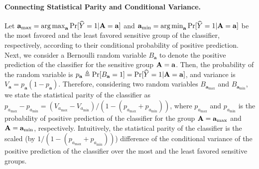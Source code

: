 \paragraph{Connecting Statistical Parity and Conditional Variance.} Let $ \mathbf{a}_{\max} = \operatorname*{arg\,max}_{\mathbf{a}} \Pr[\widehat{Y} = 1 |  \mathbf{A} = \mathbf{a}] $ and $ \mathbf{a}_{\min} = \operatorname*{arg\,min}_{\mathbf{a}} \Pr[\widehat{Y} = 1 | \mathbf{A} = \mathbf{a}] $ be the most favored and the least favored sensitive group of the classifier, respectively, according to their conditional probability of positive prediction. Next, we consider a Bernoulli random variable $ B_{\mathbf{a}} $ to denote the positive prediction of the classifier for the sensitive group $ \mathbf{A} = \mathbf{a} $. Then, the probability of the random variable is $ p_\mathbf{a} \triangleq \Pr[B_{\mathbf{a}} = 1] = \Pr[\widehat{Y} = 1| \mathbf{A} = \mathbf{a}] $, and variance is $ V_{\mathbf{a}} = p_{\mathbf{a}}(1-p_{\mathbf{a}}) $. Therefore, considering two random variables $ B_{\mathbf{a}_{\max}} $ and $ B_{\mathbf{a}_{\min}} $, we state the statistical parity of the classifier as $ p_{a_{\max}} - p_{a_{\min}} = (V_{a_{\max}} - V_{a_{\min}})/(1  - (p_{a_{\max}} + p_{a_{\min}})) $, where $ p_{a_{\max}} $ and $ p_{a_{\min}} $ is the probability of positive prediction of the classifier for the group $ \mathbf{A} = \mathbf{a}_{\max} $ and $ \mathbf{A} = \mathbf{a}_{\min} $, respectively. Intuitively, the statistical parity of the classifier is the scaled (by $ 1/(1  - (p_{a_{\max}} + p_{a_{\min}})) $) difference of the conditional variance of the positive prediction of the classifier over the most and the least favored sensitive groups.


